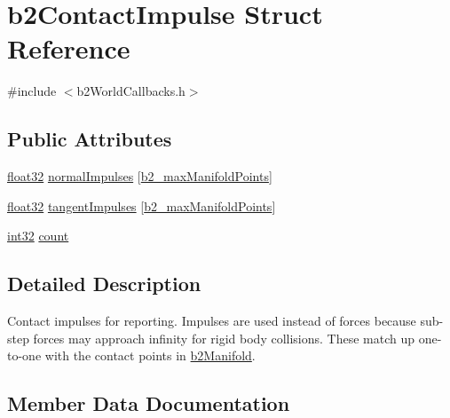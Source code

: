 \hypertarget{structb2_contact_impulse}{}\section{b2\+Contact\+Impulse Struct Reference}
\label{structb2_contact_impulse}


{\ttfamily \#include $<$b2\+World\+Callbacks.\+h$>$}

\subsection*{Public Attributes}
\begin{DoxyCompactItemize}
\item 
\mbox{\hyperlink{b2_settings_8h_aacdc525d6f7bddb3ae95d5c311bd06a1}{float32}} \mbox{\hyperlink{structb2_contact_impulse_a553d3562a3a34ea013e2d9860f6fd207}{normal\+Impulses}} \mbox{[}\mbox{\hyperlink{b2_settings_8h_aa5f44cc9edf711433dea2b2ec94f3c42}{b2\+\_\+max\+Manifold\+Points}}\mbox{]}
\item 
\mbox{\hyperlink{b2_settings_8h_aacdc525d6f7bddb3ae95d5c311bd06a1}{float32}} \mbox{\hyperlink{structb2_contact_impulse_aebd9875b1f55a90865770a53e30e609a}{tangent\+Impulses}} \mbox{[}\mbox{\hyperlink{b2_settings_8h_aa5f44cc9edf711433dea2b2ec94f3c42}{b2\+\_\+max\+Manifold\+Points}}\mbox{]}
\item 
\mbox{\hyperlink{b2_settings_8h_a43d43196463bde49cb067f5c20ab8481}{int32}} \mbox{\hyperlink{structb2_contact_impulse_a258e094ab0d769971f40d6c144420bf7}{count}}
\end{DoxyCompactItemize}


\subsection{Detailed Description}
Contact impulses for reporting. Impulses are used instead of forces because sub-\/step forces may approach infinity for rigid body collisions. These match up one-\/to-\/one with the contact points in \mbox{\hyperlink{structb2_manifold}{b2\+Manifold}}. 

\subsection{Member Data Documentation}
\mbox{\label{structb2_contact_impulse_a258e094ab0d769971f40d6c144420bf7}} 
